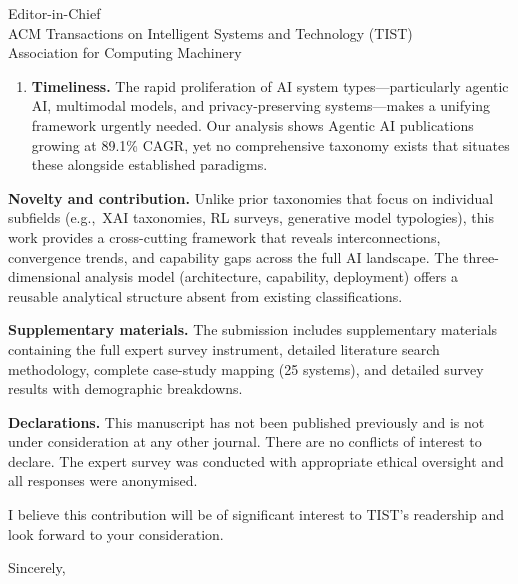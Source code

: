 \documentclass[11pt]{letter}
\begin{document}
\begin{letter}{%
  Editor-in-Chief\\
  ACM Transactions on Intelligent Systems and Technology (TIST)\\
  Association for Computing Machinery}
\begin{enumerate}
  \item \textbf{Timeliness.} The rapid proliferation of AI system types---particularly agentic AI, multimodal models, and privacy-preserving systems---makes a unifying framework urgently needed. Our analysis shows Agentic AI publications growing at 89.1\% CAGR, yet no comprehensive taxonomy exists that situates these alongside established paradigms.
\end{enumerate}

\textbf{Novelty and contribution.} Unlike prior taxonomies that focus on individual subfields (e.g.,~XAI taxonomies, RL surveys, generative model typologies), this work provides a cross-cutting framework that reveals interconnections, convergence trends, and capability gaps across the full AI landscape. The three-dimensional analysis model (architecture, capability, deployment) offers a reusable analytical structure absent from existing classifications.

\textbf{Supplementary materials.} The submission includes supplementary materials containing the full expert survey instrument, detailed literature search methodology, complete case-study mapping (25 systems), and detailed survey results with demographic breakdowns.

\textbf{Declarations.} This manuscript has not been published previously and is not under consideration at any other journal. There are no conflicts of interest to declare. The expert survey was conducted with appropriate ethical oversight and all responses were anonymised.

I believe this contribution will be of significant interest to TIST's readership and look forward to your consideration.

\closing{Sincerely,}

\end{letter}
\end{document}

